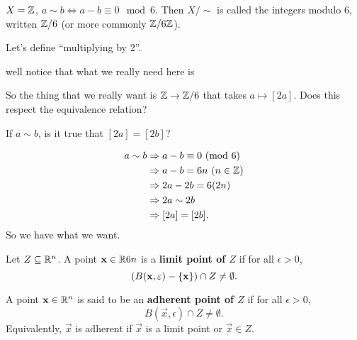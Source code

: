 \documentclass[12pt, twosided]{article}
\begin{document}
\begin{exa}
  \(X = \mathbb{Z}\), \(a \sim b \Leftrightarrow a-b \equiv 0 \mod{6}\). Then \(X/\sim\) is called the integers modulo 6, written \(\mathbb{Z}/6\) (or more commonly \(\mathbb{Z}/6\mathbb{Z}\)).

  Let's define ``multiplying by 2''.

  \begin{center}
  \end{center}

  well notice that what we really need here is
  \begin{center}
  \end{center}

  So the thing that we really want is \(\mathbb{Z} \to \mathbb{Z}/6\) that takes \(a \mapsto [2a]\). Does this respect the equivalence relation?

  If \(a \sim b\), is it true that \([2a] = [2b]\)?

  \begin{align*}
    a \sim b &\Rightarrow a-b \equiv 0 \ (\mathrm{mod}\ 6) \\
             &\Rightarrow a - b = 6n\ (n \in \mathbb{Z}) \\
             &\Rightarrow 2a -2b = 6(2n) \\
             &\Rightarrow 2a \sim 2b \\
             &\Rightarrow [2a] = [2b].
  \end{align*}
  So we have what we want.
  
\end{exa}


\begin{df}
  Let \(Z \subseteq \mathbb{R}^n\). A point \(\mathbf{x} \in \mathbb{R}6n\) is a \textbf{limit point of \(Z\)} if for all \(\epsilon > 0\), \[(B(\mathbf{x}, \varepsilon) - \left\{ \mathbf{x} \right\}) \cap Z \neq \emptyset.\]

  A point \(\mathbf{x} \in \mathbb{R}^n\) is said to be an \textbf{adherent point of \(Z\)} if for all \(\epsilon > 0\), \[B(\vec{x}, \epsilon) \cap Z \neq \emptyset.\] Equivalently, \(\vec{x}\) is adherent if \(\vec{x}\) is a limit point or \(\vec{x} \in Z\).
\end{df}
\end{document}
